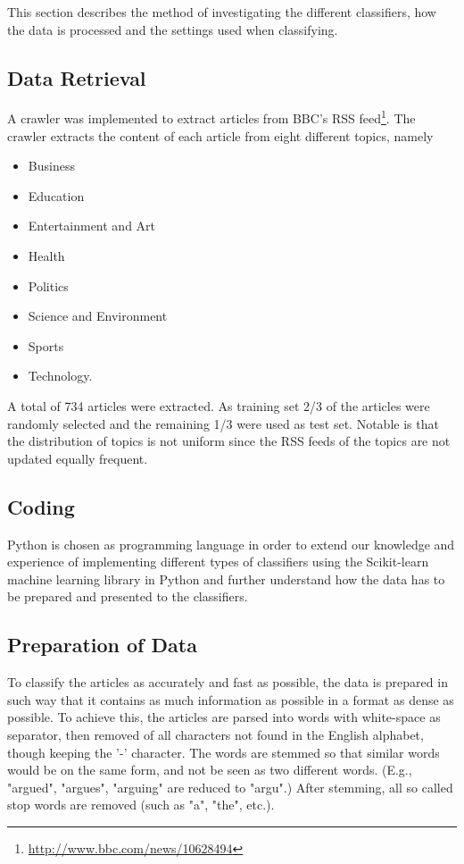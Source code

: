 This section describes the method of investigating the different classifiers, how the data is processed and the settings used when classifying.
\subsection{Data Retrieval}
A crawler was implemented to extract articles from BBC's RSS feed\footnote{\url{http://www.bbc.com/news/10628494}}. The crawler extracts the content of each article from eight different topics, namely
\begin{itemize}[noitemsep,nolistsep]
\small
	\item Business
	\item Education
	\item Entertainment and Art
	\item Health
	\item Politics
	\item Science and Environment
	\item Sports
	\item Technology.
\end{itemize}
A total of 734 articles were extracted. As training set 2/3 of the articles were randomly selected and the remaining 1/3 were used as test set. Notable is that the distribution of topics is not uniform since the RSS feeds of the topics are not updated equally frequent. 
\subsection{Coding}
Python is chosen as programming language in order to extend our knowledge and experience of implementing different types of classifiers using the Scikit-learn machine learning library in Python and further understand how the data has to be prepared and presented to the classifiers.
\subsection{Preparation of Data}
To classify the articles as accurately and fast as possible, the data is prepared in such way that it contains as much information as possible in a format as dense as possible. To achieve this, the articles are parsed into words with white-space as separator, then removed of all characters not found in the English alphabet, though keeping the '-' character. The words are stemmed so that similar words would be on the same form, and not be seen as two different words. (E.g., "argued", "argues", "arguing" are reduced to "argu".) After stemming, all so called stop words are removed (such as "a", "the", etc.). 
